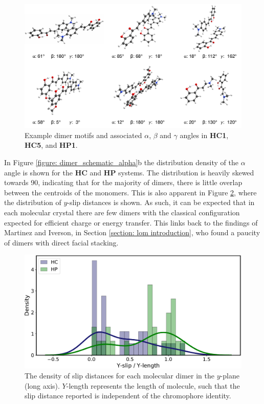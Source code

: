 \begin{figure}[H]
\centering
  \includegraphics[width=0.9\linewidth]{5ConnectingCrystalStructure/motif_examples}
  \caption[Example dimer motifs in \textbf{HC1}, \textbf{HC5}, and \textbf{HP1}.]{Example dimer motifs and associated $\alpha$, $\beta$ and $\gamma$ angles in \textbf{HC1}, \textbf{HC5}, and \textbf{HP1}.}
  \label{figure: motif_examples}
\end{figure}

In Figure \ref{figure: dimer_schematic_alpha}b the distribution density of the $\alpha$ angle is shown for the \textbf{HC} and \textbf{HP} systems. The distribution is heavily skewed towards 90\degree, indicating that for the majority of dimers, there is little overlap between the centroids of the monomers. This is also apparent in Figure \ref{figure: yslip_density}, where the distribution of $y$-slip distances is shown. As such, it can be expected that in each molecular crystal there are few dimers with the classical configuration expected for efficient charge or energy transfer. This links back to the findings of Martinez and Iverson, in Section \ref{section: lom introduction}, who found a paucity of dimers with direct facial stacking.\cite{Martinez2012}

\begin{figure}[H]
\centering
  \includegraphics[width=0.8\linewidth]{5ConnectingCrystalStructure/yslip_density}
  \caption[$y$-slip densities for dimer configurations of \textbf{HC} and \textbf{HP} systems]{The density of slip distances for each molecular dimer in the $y$-plane (long axis). $Y$-length represents the length of molecule, such that the slip distance reported is independent of the chromophore identity.}
  \label{figure: yslip_density}
\end{figure}

